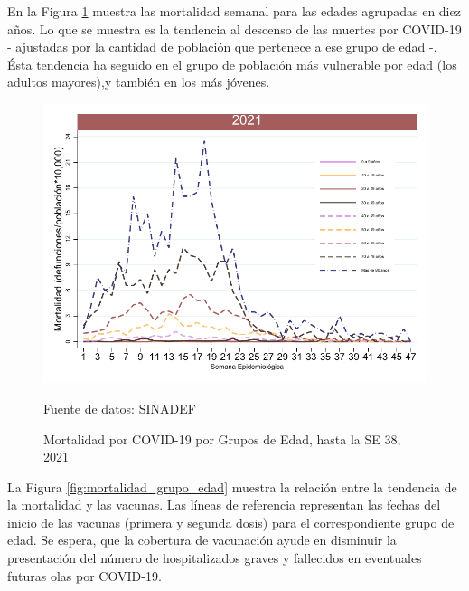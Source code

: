 \documentclass[12pt,a4paper,openany]{book}
\begin{document}
	En la Figura \ref{fig:mortalidad_edad} muestra las mortalidad semanal para las edades agrupadas en diez años. Lo que se muestra es la tendencia al descenso de las muertes por COVID-19 - ajustadas por la cantidad de población que pertenece a ese grupo de edad -.  Ésta tendencia ha seguido en el grupo de población más vulnerable por edad (los adultos mayores),y también en los más jóvenes.\\
	\begin{figure}[h]
	\caption{Mortalidad por COVID-19 por Grupos de Edad, hasta la SE 38, 2021}\label{fig:mortalidad_edad}
	\begin{center}
		\includegraphics[width=0.65\linewidth]{../figuras/mortalidad_edad.pdf}
	\end{center}
	{\footnotesize Fuente de datos: SINADEF} 
	\end{figure}


	La Figura \ref{fig:mortalidad_grupo_edad} muestra la relación entre la tendencia de la mortalidad y las vacunas. Las líneas de referencia representan las fechas del inicio de las vacunas (primera y segunda dosis) para el correspondiente grupo de edad. Se espera, que la cobertura de vacunación ayude en disminuir la presentación del número de hospitalizados graves y fallecidos en eventuales futuras olas por COVID-19.
\end{document}
